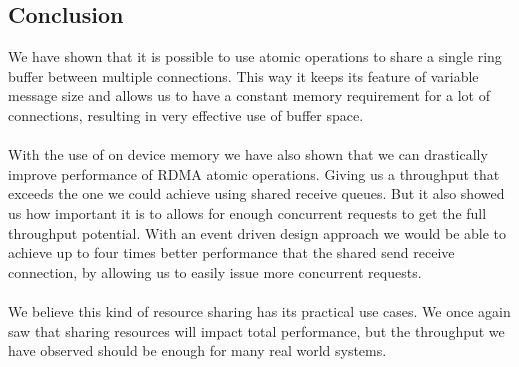 \subsection{Conclusion}

We have shown that it is possible to use atomic operations to share a single ring buffer between multiple connections. This
way it keeps its feature of variable message size and allows us to have a constant memory requirement for a lot of connections,
resulting in very effective use of buffer space.

\paragraph{} With the use of on device memory we have also shown that we can drastically improve performance of RDMA atomic 
operations. Giving us a throughput that exceeds the one we could achieve using shared receive queues. But it 
also showed us how important it is to allows for enough concurrent requests to get the full throughput potential. 
With an event driven design approach we would be able to achieve up to four times better performance that the shared
send receive connection, by allowing us to easily issue more concurrent requests.

\paragraph{} We believe this kind of resource sharing has its practical use cases. We once again saw that sharing resources
will impact total performance, but the throughput we have observed should be enough for many real world systems. 
